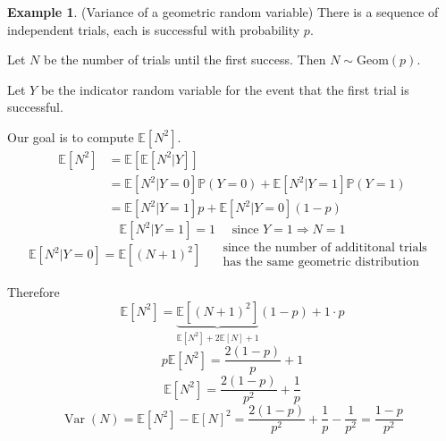 \documentclass[a4paper,11pt]{amsbook}
\theoremstyle{definition}
\newtheorem{example}{\hspace{-2em} \color{darkblue} Example}[chapter]
\theoremstyle{remark}
\newcommand{\E}{\mathbb{E}}
\renewcommand{\P}{\mathbb{P}}
\DeclareMathOperator\Var{Var}
\newcommand\0{\varnothing}
\newcommand\Geom{\text{Geom}}
\begin{document}
\begin{example}
    (Variance of a geometric random variable) There is a sequence of independent trials, 
    each is successful with probability $p$.

    Let $N$ be the number of trials until the first success. Then $N\sim\Geom(p)$.

    Let $Y$ be the indicator random variable for the event that the first trial is successful.

    Our goal is to compute $\E[N^2]$.
    \begin{align*}
        \E[N^2]&=\E[\E[N^2|Y]] \\
        &=\E[N^2|Y=0]\P(Y=0)+\E[N^2|Y=1]\P(Y=1) \\
        &=\E[N^2|Y=1]p+\E[N^2|Y=0](1-p)
    \end{align*}
    $$\E[N^2|Y=1]=1\quad\text{ since }Y=1\Rightarrow N=1$$
    $$\E[N^2|Y=0]=\E[(N+1)^2]\quad\substack{\text{ since the number of addititonal trials } \\ \text{ has the same geometric distribution }}$$

    Therefore $$\E[N^2]=\underbrace{\E[(N+1)^2]}_{\E[N^2]+2\E[N]+1}(1-p)+1\cdot p$$
    $$p\E[N^2]=\frac{2(1-p)}{p}+1$$
    $$\E[N^2]=\frac{2(1-p)}{p^2}+\frac{1}{p}$$
    $$\Var(N)=\E[N^2]-\E[N]^2=\frac{2(1-p)}{p^2}+\frac{1}{p}-\frac{1}{p^2}=\frac{1-p}{p^2}$$
\end{example}
\end{document}
